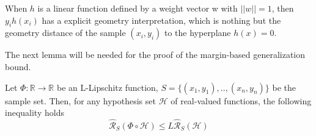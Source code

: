 When $h$ is a linear function defined by a weight vector w with $||w||=1$, then $y_ih(x_i)$ has a explicit geometry interpretation, which is nothing but the geometry distance of the sample $(x_i,y_i)$ to the hyperplane $h(x)=0$.

The next lemma will be needed for the proof of the margin-based generalization bound.
\begin{lemma}
	Let $\Phi: \mathbb{R} \to \mathbb{R}$ be an L-Lipschitz function, $S=\{(x_1,y_1),..,(x_n,y_n)\}$ be the sample set. Then, for any hypothesis set $\mathcal{H}$ of real-valued functions, the following inequality holds
	\begin{equation}
	\hat{\mathcal{R}}_S(\Phi \circ \mathcal{H}) \leq L \hat{\mathcal{R}}_S(\mathcal{H})
	\end{equation} 
\end{lemma}
